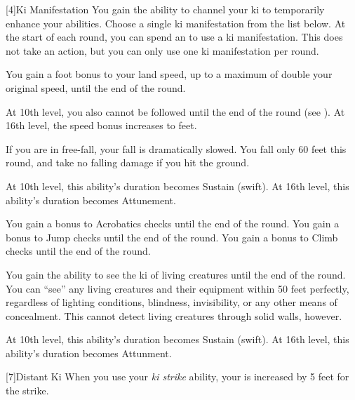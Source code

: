             [4]{Ki Manifestation}
            You gain the ability to channel your ki to temporarily enhance your abilities.
            Choose a single ki manifestation from the list below.
            At the start of each round, you can spend an  to use a ki manifestation.
            This does not take an action, but you can only use one ki manifestation per round.
            {
                You gain a  foot bonus to your land speed, up to a maximum of double your original speed, until the end of the round.

                At 10th level, you also cannot be followed until the end of the round (see ).
                At 16th level, the speed bonus increases to  feet.

                If you are in free-fall, your fall is dramatically slowed.
                You fall only 60 feet this round, and take no falling damage if you hit the ground.

                At 10th level, this ability's duration becomes Sustain (swift).
                At 16th level, this ability's duration becomes Attunement.

                You gain a  bonus to Acrobatics checks until the end of the round.
                You gain a  bonus to Jump checks until the end of the round.
                You gain a  bonus to Climb checks until the end of the round.

                You gain the ability to see the ki of living creatures until the end of the round.
                You can ``see'' any living creatures and their equipment within 50 feet perfectly, regardless of lighting conditions, blindness, invisibility, or any other means of concealment.
                This cannot detect living creatures through solid walls, however.

                At 10th level, this ability's duration becomes Sustain (swift).
                At 16th level, this ability's duration becomes Attunment.
            }

            [7]{Distant Ki} When you use your \textit{ki strike} ability, your  is increased by 5 feet for the strike.

